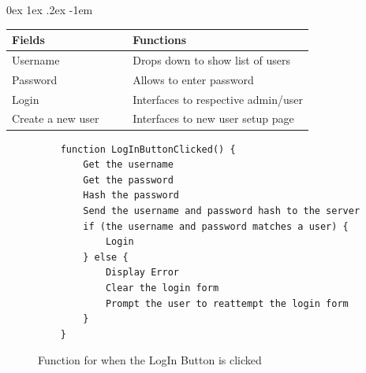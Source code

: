 \documentclass[12pt, a4paper]{article}
\makeatletter
\renewcommand\paragraph{\@startsection{paragraph}{5}{\parindent}%
  {0ex \@plus1ex \@minus.2ex}%
  {-1em}%
  {\normalfont\normalsize\bfseries}}
\makeatother
\begin{document}
                \paragraph{}
                    \begingroup
                        \centering
                        \begin{flushleft}
                            \resizebox{\linewidth}{!} {
                                \begin{tabular}{| m{0.4\linewidth} | m{0.6\linewidth} |}
                                    \hline
                                    \textbf {Fields} & \textbf {Functions} \\ \hline
                                    Username & Drops down to show list of users  \\ \hline
                                    Password & Allows to enter password  \\ \hline
                                    Login & Interfaces to respective admin/user  \\ \hline
                                    Create a new user & Interfaces to new user setup page  \\
                                    \hline
                                \end{tabular}
                            }
                            \label{tbl:LogIntable}
                        \end{flushleft}
                    \endgroup
                    \footnotesize
                    \begin{figure}[H]
                        \begin{lstlisting}
    function LogInButtonClicked() {
        Get the username
        Get the password
        Hash the password
        Send the username and password hash to the server
        if (the username and password matches a user) {
            Login
        } else {
            Display Error
            Clear the login form
            Prompt the user to reattempt the login form
        }
    }                        
                        \end{lstlisting}
                        \caption{Function for when the LogIn Button is clicked}
                    \end{figure}
                    \normalsize
\end{document}
